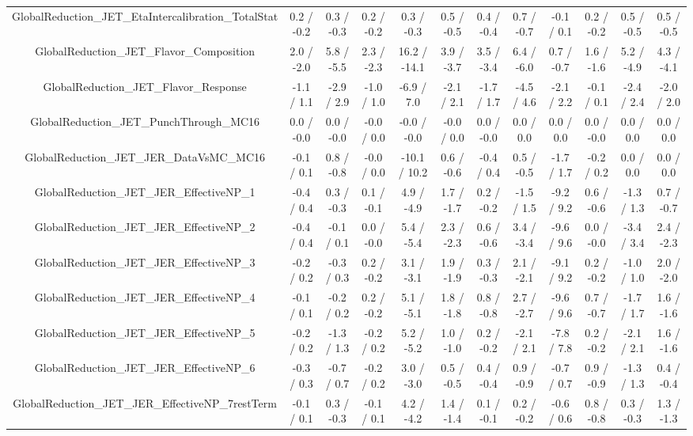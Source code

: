 \begin{table}[htbp]
\begin{center}
\begin{tabular}{|c|c|c|c|c|c|c|c|c|c|c|c|}
  GlobalReduction_JET_EtaIntercalibration_TotalStat & 0.2 / -0.2 & 0.3 / -0.3 & 0.2 / -0.2 & 0.3 / -0.3 & 0.5 / -0.5 & 0.4 / -0.4 & 0.7 / -0.7 & -0.1 / 0.1 & 0.2 / -0.2 & 0.5 / -0.5 & 0.5 / -0.5 \\ 
  GlobalReduction_JET_Flavor_Composition & 2.0 / -2.0 & 5.8 / -5.5 & 2.3 / -2.3 & 16.2 / -14.1 & 3.9 / -3.7 & 3.5 / -3.4 & 6.4 / -6.0 & 0.7 / -0.7 & 1.6 / -1.6 & 5.2 / -4.9 & 4.3 / -4.1 \\ 
  GlobalReduction_JET_Flavor_Response & -1.1 / 1.1 & -2.9 / 2.9 & -1.0 / 1.0 & -6.9 / 7.0 & -2.1 / 2.1 & -1.7 / 1.7 & -4.5 / 4.6 & -2.1 / 2.2 & -0.1 / 0.1 & -2.4 / 2.4 & -2.0 / 2.0 \\ 
  GlobalReduction_JET_PunchThrough_MC16 & 0.0 / -0.0 & 0.0 / -0.0 & -0.0 / 0.0 & -0.0 / -0.0 & -0.0 / 0.0 & 0.0 / -0.0 & 0.0 / 0.0 & 0.0 / 0.0 & 0.0 / -0.0 & 0.0 / 0.0 & 0.0 / 0.0 \\ 
  GlobalReduction_JET_JER_DataVsMC_MC16 & -0.1 / 0.1 & 0.8 / -0.8 & -0.0 / 0.0 & -10.1 / 10.2 & 0.6 / -0.6 & -0.4 / 0.4 & 0.5 / -0.5 & -1.7 / 1.7 & -0.2 / 0.2 & 0.0 / 0.0 & 0.0 / 0.0 \\ 
  GlobalReduction_JET_JER_EffectiveNP_1 & -0.4 / 0.4 & 0.3 / -0.3 & 0.1 / -0.1 & 4.9 / -4.9 & 1.7 / -1.7 & 0.2 / -0.2 & -1.5 / 1.5 & -9.2 / 9.2 & 0.6 / -0.6 & -1.3 / 1.3 & 0.7 / -0.7 \\ 
  GlobalReduction_JET_JER_EffectiveNP_2 & -0.4 / 0.4 & -0.1 / 0.1 & 0.0 / -0.0 & 5.4 / -5.4 & 2.3 / -2.3 & 0.6 / -0.6 & 3.4 / -3.4 & -9.6 / 9.6 & 0.0 / -0.0 & -3.4 / 3.4 & 2.4 / -2.3 \\ 
  GlobalReduction_JET_JER_EffectiveNP_3 & -0.2 / 0.2 & -0.3 / 0.3 & 0.2 / -0.2 & 3.1 / -3.1 & 1.9 / -1.9 & 0.3 / -0.3 & 2.1 / -2.1 & -9.1 / 9.2 & 0.2 / -0.2 & -1.0 / 1.0 & 2.0 / -2.0 \\ 
  GlobalReduction_JET_JER_EffectiveNP_4 & -0.1 / 0.1 & -0.2 / 0.2 & 0.2 / -0.2 & 5.1 / -5.1 & 1.8 / -1.8 & 0.8 / -0.8 & 2.7 / -2.7 & -9.6 / 9.6 & 0.7 / -0.7 & -1.7 / 1.7 & 1.6 / -1.6 \\ 
  GlobalReduction_JET_JER_EffectiveNP_5 & -0.2 / 0.2 & -1.3 / 1.3 & -0.2 / 0.2 & 5.2 / -5.2 & 1.0 / -1.0 & 0.2 / -0.2 & -2.1 / 2.1 & -7.8 / 7.8 & 0.2 / -0.2 & -2.1 / 2.1 & 1.6 / -1.6 \\ 
  GlobalReduction_JET_JER_EffectiveNP_6 & -0.3 / 0.3 & -0.7 / 0.7 & -0.2 / 0.2 & 3.0 / -3.0 & 0.5 / -0.5 & 0.4 / -0.4 & 0.9 / -0.9 & -0.7 / 0.7 & 0.9 / -0.9 & -1.3 / 1.3 & 0.4 / -0.4 \\ 
  GlobalReduction_JET_JER_EffectiveNP_7restTerm & -0.1 / 0.1 & 0.3 / -0.3 & -0.1 / 0.1 & 4.2 / -4.2 & 1.4 / -1.4 & 0.1 / -0.1 & 0.2 / -0.2 & -0.6 / 0.6 & 0.8 / -0.8 & 0.3 / -0.3 & 1.3 / -1.3 \\ 

\end{tabular}
\end{center}
\end{table}
